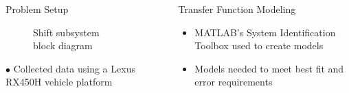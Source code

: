 \documentclass[final]{beamer}
\newlength{\sepwid}
\newlength{\onecolwid}
\begin{document}
\begin{frame}[t]
\begin{columns}[t]
\begin{column}{\onecolwid}
\begin{block}{Problem Setup}
\begin{figure}
\begin{tikzpicture}
  \end{tikzpicture}
    \caption{Shift subsystem block diagram}
    \label{fig:shiftModelArchitecture}
\end{figure}

$\bullet$ Collected data using a Lexus RX450H vehicle platform  



\vskip -1cm
\end{block}

\end{column} %

\begin{column}{\sepwid}\end{column} %

\begin{column}{\onecolwid} %


\begin{block}{Transfer Function Modeling}
\vskip -1cm
\begin{itemize}
    \item MATLAB's System Identification Toolbox used to create models 
    \item Models needed to meet best fit and error requirements 


\end{itemize}
\end{block}
\end{column}
\end{columns}
\end{frame}
\end{document}
